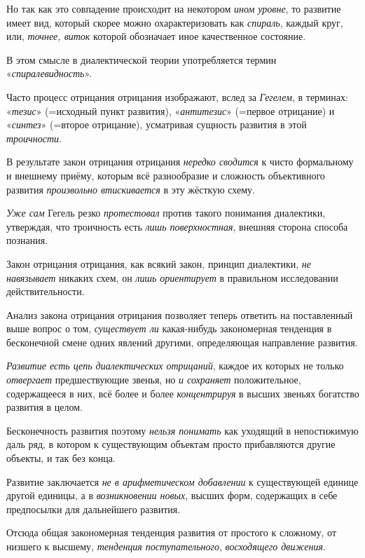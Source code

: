 \documentclass[a4paper,14pt,russian]{extreport}
\begin{document}
Но так как это совпадение происходит на некотором \emph{ином уровне}, то развитие имеет вид, который скорее можно охарактеризовать как \emph{спираль}, каждый круг, или, \emph{точнее, виток} которой обозначает иное качественное состояние.

В этом смысле в диалектической теории употребляется термин «\emph{спиралевидность}».

Часто процесс отрицания отрицания изображают, вслед за \emph{Гегелем}, в терминах: «\emph{тезис}» (=исходный пункт развития), «\emph{антитезис}» (=первое отрицание) и «\emph{синтез}» (=второе отрицание), усматривая сущность развития в этой \emph{троичности}.

В результате закон отрицания отрицания \emph{нередко сводится} к чисто формальному и внешнему приёму, которым всё разнообразие и сложность объективного развития \emph{произвольно втискивается} в эту жёсткую схему.

\emph{Уже сам} Гегель резко \emph{протестовал} против такого понимания диалектики, утверждая, что троичность есть \emph{лишь поверхностная}, внешняя сторона способа познания.

Закон отрицания отрицания, как всякий закон, принцип диалектики, \emph{не навязывает} никаких схем, он \emph{лишь ориентирует} в правильном исследовании действительности.

Анализ закона отрицания отрицания позволяет теперь ответить на поставленный выше вопрос о том, \emph{существует ли} какая-нибудь закономерная тенденция в бесконечной смене одних явлений другими, определяющая направление развития.

\emph{Развитие есть цепь диалектических отрицаний}, каждое их которых не только \emph{отвергает} предшествующие звенья, но \emph{и сохраняет} положительное, содержащееся в них, всё более и более \emph{концентрируя} в высших звеньях богатство развития в целом.

Бесконечность развития поэтому \emph{нельзя понимать} как уходящий в непостижимую даль ряд, в котором к существующим объектам просто прибавляются другие объекты, и так без конца.

Развитие заключается \emph{не в арифметическом добавлении} к существующей единице другой единицы, а в \emph{возникновении новых}, высших форм, содержащих в себе предпосылки для дальнейшего развития.

Отсюда общая закономерная тенденция развития от простого к сложному, от низшего к высшему, \emph{тенденция поступательного}, \emph{восходящего движения}.
\end{document}
